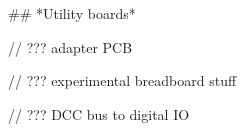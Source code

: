## *Utility boards*

// ??? adapter PCB

// ??? experimental breadboard stuff

// ??? DCC bus to digital IO 
